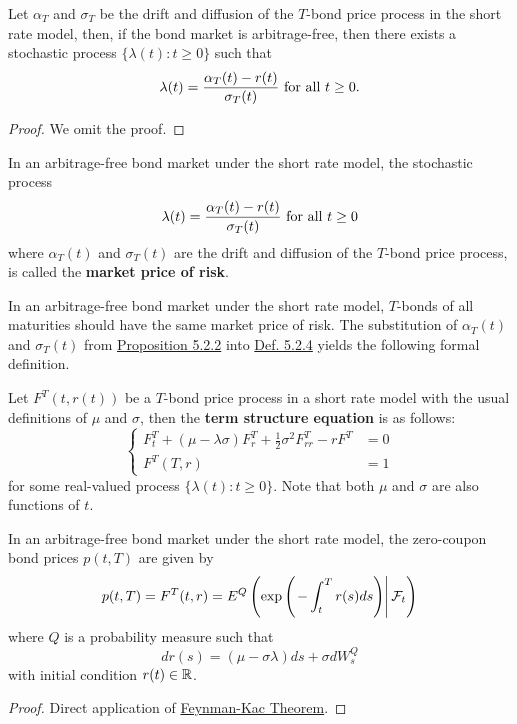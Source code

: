 \documentclass[11pt,fleqn]{book} %
\begin{document}
\begin{proposition} \label{prop:523}
Let \(\alpha_T\) and \(\sigma_T\) be the drift and diffusion of the \(T\)-bond price process in the short rate model, then, if the bond market is arbitrage-free, then there exists a stochastic process \(\{\lambda(t): t \geq 0\}\) such that
\[
\lambda(t) = \frac{\alpha_T(t) - r(t)}{\sigma_T(t)} \text{ for all } t \geq 0.
\]
\end{proposition}
\begin{proof}
We omit the proof.
\end{proof}

\begin{definition} \label{def:524}
In an arbitrage-free bond market under the short rate model, the stochastic process
\[
\lambda(t) = \frac{\alpha_T(t) - r(t)}{\sigma_T(t)} \text{ for all } t \geq 0
\]
where \(\alpha_T(t)\) and \(\sigma_T(t)\) are the drift and diffusion of the \(T\)-bond price process, is called the \textbf{market price of risk}.
\end{definition}

\begin{remark} \label{rmk:525}
In an arbitrage-free bond market under the short rate model, \(T\)-bonds of all maturities should have the same market price of risk. The substitution of \(\alpha_T(t)\) and \(\sigma_T(t)\) from \hyperref[prop:522]{Proposition 5.2.2} into \hyperref[def:524]{Def. 5.2.4} yields the following formal definition.
\end{remark}

\begin{definition} \label{def:526}
Let \(F^T(t, r(t))\) be a \(T\)-bond price process in a short rate model with the usual definitions of \(\mu\) and \(\sigma\), then the \textbf{term structure equation} is as follows:
\[
\left\{
\begin{array}{rl}
F_t^T + (\mu - \lambda\sigma)F_r^T + \frac12\sigma^2F_{rr}^T - rF^T &= 0 \\
F^T(T, r) &= 1
\end{array}
\right.
\]
for some real-valued process \(\{\lambda(t): t \geq 0\}\). Note that both \(\mu\) and \(\sigma\) are also functions of \(t\).
\end{definition}

\begin{theorem} \label{thm:527}
In an arbitrage-free bond market under the short rate model, the zero-coupon bond prices \(p(t, T)\) are given by
\[
p(t, T) = F^T(t, r) = E^Q\left(\exp\left(\left.-\int_t^T r(s)ds\right)\right|\mathcal{F}_t\right)
\]
where \(Q\) is a probability measure such that
\[
dr(s) = (\mu - \sigma\lambda)ds + \sigma dW_s^Q
\]
with initial condition \(r(t) \in \mathbb{R}\).
\end{theorem}
\begin{proof}
Direct application of \hyperref[thm:414]{Feynman-Kac Theorem}.
\end{proof}
\end{document}
